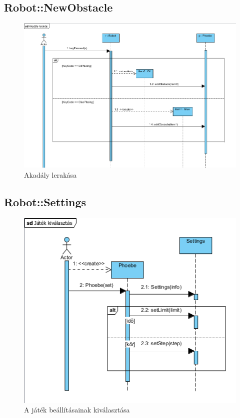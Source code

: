 \subsection{Robot::NewObstacle}
\begin{figure}[h]
\begin{center}
\includegraphics[width=17cm]{images/RobotAddObstacle.png}
\caption{Akadály lerakása}
\label{fig:example9}
\end{center}
\end{figure}
\pagebreak

\subsection{Robot::Settings}
\begin{figure}[h]
\begin{center}
\includegraphics[width=17cm]{images/kivalasztas.PNG}
\caption{A játék beállításainak kiválasztása}
\label{fig:example10}
\end{center}
\end{figure}
\pagebreak

